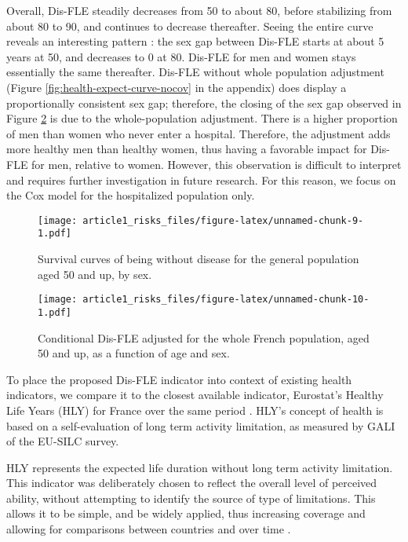 \documentclass[risks,article,submit,moreauthors,pdftex]{Definitions/mdpi}
\begin{document}
Overall, Dis-FLE steadily decreases from 50 to about 80, before
stabilizing from about 80 to 90, and continues to decrease thereafter.
Seeing the entire curve reveals an interesting pattern : the sex gap
between Dis-FLE starts at about 5 years at 50, and decreases to 0 at 80.
Dis-FLE for men and women stays essentially the same thereafter. Dis-FLE
without whole population adjustment (Figure
\ref{fig:health-expect-curve-nocov} in the appendix) does display a
proportionally consistent sex gap; therefore, the closing of the sex gap
observed in Figure \ref{fig:health-adj-expect-curve-nocov} is due to the
whole-population adjustment. There is a higher proportion of men than
women who never enter a hospital. Therefore, the adjustment adds more
healthy men than healthy women, thus having a favorable impact for
Dis-FLE for men, relative to women. However, this observation is
difficult to interpret and requires further investigation in future
research. For this reason, we focus on the Cox model for the
hospitalized population only.

\begin{figure}
\centering
\texttt{[image: article1\_risks\_files/figure-latex/unnamed-chunk-9-1.pdf]}
\caption{\label{fig:health-adj-surv-curve-nocov}Survival curves of being
without disease for the general population aged 50 and up, by sex.}
\end{figure}

\begin{figure}
\centering
\texttt{[image: article1\_risks\_files/figure-latex/unnamed-chunk-10-1.pdf]}
\caption{\label{fig:health-adj-expect-curve-nocov} Conditional Dis-FLE
adjusted for the whole French population, aged 50 and up, as a function
of age and sex.}
\end{figure}

To place the proposed Dis-FLE indicator into context of existing health
indicators, we compare it to the closest available indicator, Eurostat's
Healthy Life Years (HLY) for France over the same period
\citep{eurostat_healthy_2020}. HLY's concept of health is based on a
self-evaluation of long term activity limitation, as measured by GALI of
the EU-SILC survey.

HLY represents the expected life duration without long term activity
limitation. This indicator was deliberately chosen to reflect the
overall level of perceived ability, without attempting to identify the
source of type of limitations. This allows it to be simple, and be
widely applied, thus increasing coverage and allowing for comparisons
between countries and over time \citep{robine_creating_2003}.
\end{document}
